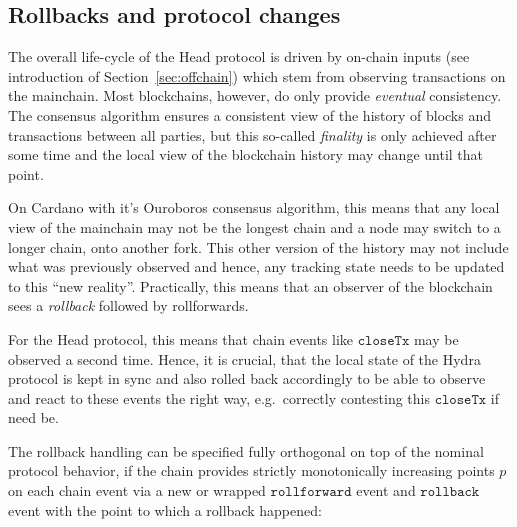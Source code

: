 \subsection{Rollbacks and protocol changes}\label{sec:rollbacks}

The overall life-cycle of the Head protocol is driven by on-chain inputs (see
introduction of Section~\ref{sec:offchain}) which stem from observing
transactions on the mainchain. Most blockchains, however, do only provide
\emph{eventual} consistency. The consensus algorithm ensures a consistent view
of the history of blocks and transactions between all parties, but this
so-called \emph{finality} is only achieved after some time and the local view of
the blockchain history may change until that point.

On Cardano with it's Ouroboros consensus algorithm, this means that any local
view of the mainchain may not be the longest chain and a node may switch to a
longer chain, onto another fork. This other version of the history may not
include what was previously observed and hence, any tracking state needs to be
updated to this ``new reality''. Practically, this means that an observer of the
blockchain sees a \emph{rollback} followed by rollforwards.

For the Head protocol, this means that chain events like $\mathtt{closeTx}$ may
be observed a second time. Hence, it is crucial, that the local state of the
Hydra protocol is kept in sync and also rolled back accordingly to be able to
observe and react to these events the right way, e.g.\ correctly contesting this
$\mathtt{closeTx}$ if need be.

The rollback handling can be specified fully orthogonal on top of the nominal
protocol behavior, if the chain provides strictly monotonically increasing
points $p$ on each chain event via a new or wrapped $\mathtt{rollforward}$
event and $\mathtt{rollback}$ event with the point to which a rollback happened:\\

